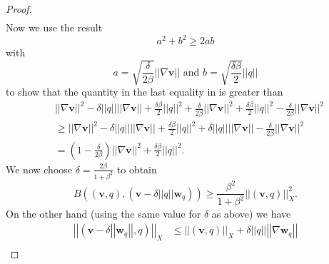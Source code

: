 \documentclass[12pt,a4paper]{article}
\theoremstyle{definition}
\begin{document}
\begin{proof}
\begin{equation}
\begin{aligned}
\end{aligned}
\end{equation}
Now we use the result
\begin{equation}
a^2+b^2\geq 2ab \nonumber
\end{equation}
with \begin{equation}\nonumber
a=\sqrt{\frac{\delta}{2\beta}}\left|\left|\nabla\textbf{v}\right|\right|\text{ and } b = \sqrt{\frac{\delta \beta }{2}}\left|\left|q\right|\right|
\end{equation}
to show that the quantity in the last equality in is greater than
\begin{equation}
\begin{aligned}\nonumber
&\left|\left|\nabla \textbf{v}\right|\right|^2 -  \delta\left|\left|q\right|\right|\left|\left|\nabla \textbf{v}\right|\right| +\frac{\delta \beta }{2}\left|\left|q\right|\right|^2 + \frac{\delta}{2\beta}\left|\left|\nabla\textbf{v}\right|\right|^2 +\frac{\delta \beta }{2}\left|\left|q\right|\right|^2 - \frac{\delta}{2\beta}\left|\left|\nabla\textbf{v}\right|\right|^2\\
&\geq \left|\left|\nabla \textbf{v}\right|\right|^2 -  \delta\left|\left|q\right|\right|\left|\left|\nabla \textbf{v}\right|\right| +\frac{\delta \beta }{2}\left|\left|q\right|\right|^2 + \delta\left|\left|q\right|\right|\left|\left|\nabla \textbf{v}\right|\right|- \frac{\delta}{2\beta}\left|\left|\nabla\textbf{v}\right|\right|^2\\
&=\left(1-\frac{\delta}{2\beta}\right)\left|\left|\nabla \textbf{v}\right|\right|^2 +\frac{\delta\beta}{2}\left|\left|q\right|\right|^2.
\end{aligned}
\end{equation}
We now choose $\delta=\frac{2\beta}{1+\beta^2}$ to obtain
\begin{equation}\nonumber
B\left(\left(\textbf{v},q\right),\left(\textbf{v}-\delta\left|\left|q\right|\right|\textbf{w}_q\right)\right)\geq \frac{\beta^2}{1+\beta^2}\left|\left|\left(\textbf{v},q\right)\right|\right|_X^2.
\end{equation}
On the other hand (using the same value for $\delta$ as above) we have
\begin{equation}
\begin{aligned}\nonumber
\left|\left|\left(\textbf{v}-\delta\left|\left|\textbf{w}_q\right|\right|,q\right)\right|\right|_X&\leq \left|\left|\left(\textbf{v},q\right)\right|\right|_X+\delta\left|\left|q\right|\right|\left|\left|\nabla \textbf{w}_q\right|\right|\\

\end{aligned}
\end{equation}
\end{proof}
\end{document}
